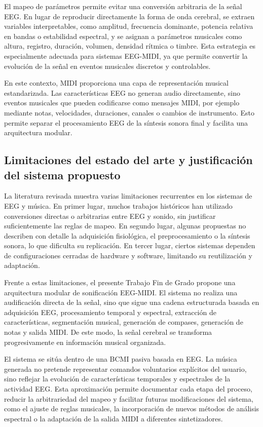 \documentclass[../main.tex]{subfiles}
\begin{document}
El mapeo de parámetros permite evitar una conversión arbitraria de la señal EEG. En lugar de reproducir directamente la forma de onda cerebral, se extraen variables interpretables, como amplitud, frecuencia dominante, potencia relativa en bandas o estabilidad espectral, y se asignan a parámetros musicales como altura, registro, duración, volumen, densidad rítmica o timbre. Esta estrategia es especialmente adecuada para sistemas EEG-MIDI, ya que permite convertir la evolución de la señal en eventos musicales discretos y controlables.

En este contexto, MIDI proporciona una capa de representación musical estandarizada. Las características EEG no generan audio directamente, sino eventos musicales que pueden codificarse como mensajes MIDI, por ejemplo mediante notas, velocidades, duraciones, canales o cambios de instrumento. Esto permite separar el procesamiento EEG de la síntesis sonora final y facilita una arquitectura modular.

\subsection{Limitaciones del estado del arte y justificación del sistema propuesto}

La literatura revisada muestra varias limitaciones recurrentes en los sistemas de EEG y música. En primer lugar, muchos trabajos históricos han utilizado conversiones directas o arbitrarias entre EEG y sonido, sin justificar suficientemente las reglas de mapeo. En segundo lugar, algunas propuestas no describen con detalle la adquisición fisiológica, el preprocesamiento o la síntesis sonora, lo que dificulta su replicación. En tercer lugar, ciertos sistemas dependen de configuraciones cerradas de hardware y software, limitando su reutilización y adaptación.

Frente a estas limitaciones, el presente Trabajo Fin de Grado propone una arquitectura modular de sonificación EEG-MIDI. El sistema no realiza una audificación directa de la señal, sino que sigue una cadena estructurada basada en adquisición EEG, procesamiento temporal y espectral, extracción de características, segmentación musical, generación de compases, generación de notas y salida MIDI. De este modo, la señal cerebral se transforma progresivamente en información musical organizada.

El sistema se sitúa dentro de una BCMI pasiva basada en EEG. La música generada no pretende representar comandos voluntarios explícitos del usuario, sino reflejar la evolución de características temporales y espectrales de la actividad EEG. Esta aproximación permite documentar cada etapa del proceso, reducir la arbitrariedad del mapeo y facilitar futuras modificaciones del sistema, como el ajuste de reglas musicales, la incorporación de nuevos métodos de análisis espectral o la adaptación de la salida MIDI a diferentes sintetizadores.
\end{document}
